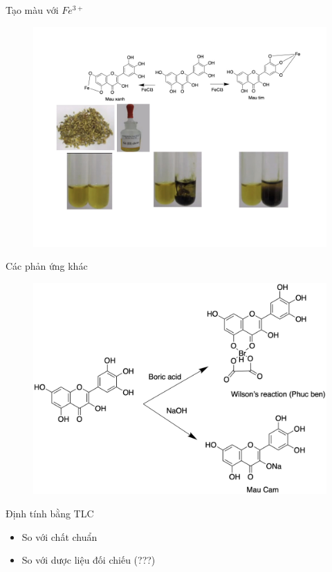 \documentclass[11pt]{beamer}
\begin{document}
\begin{frame}{Tạo màu với $Fe^{3+}$}
	\begin{figure}
		\centering
		\includegraphics[scale=0.25]{Phan ung Fe.jpeg}
	\end{figure}
\end{frame}
\begin{frame}{Các phản ứng khác}
	\begin{figure}
		\centering
		\includegraphics[scale=0.6]{Tao phan ung khac.png}
	\end{figure}
\end{frame}
\begin{frame}{Định tính bằng TLC}
	\begin{itemize}
		\item So với chất chuẩn
		\item So với dược liệu đối chiếu (???)
	\end{itemize}
\end{frame}
\end{document}
